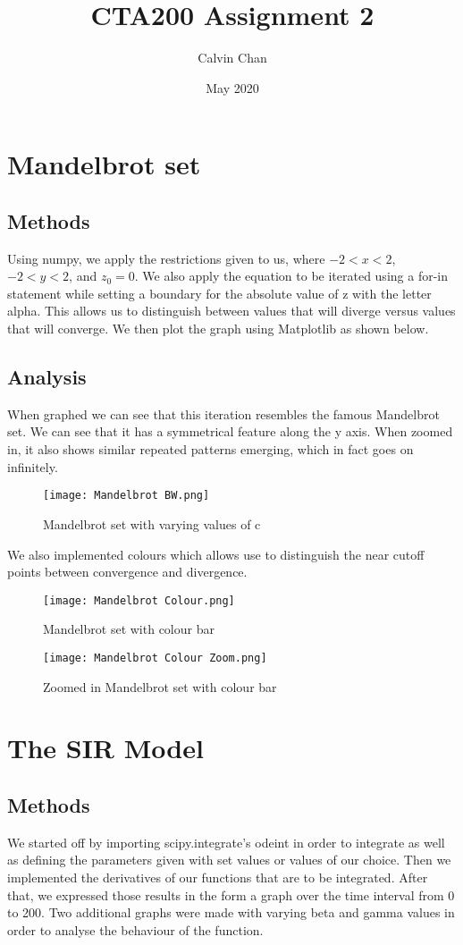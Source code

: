 \documentclass{article}
\title{CTA200 Assignment 2}
\author{Calvin Chan}
\date{May 2020}
\begin{document}
\maketitle
\section{Mandelbrot set}
\subsection{Methods}
Using numpy, we apply the restrictions given to us, where $-2 < x < 2$, $-2 < y < 2$, and $z_0 = 0$. We also apply the equation to be iterated using a for-in statement while setting a boundary for the absolute value of z with the letter alpha. This allows us to distinguish between values that will diverge versus values that will converge. We then plot the graph using Matplotlib as shown below. 
\subsection{Analysis}
When graphed we can see that this iteration resembles the famous Mandelbrot set. We can see that it has a symmetrical feature along the y axis. When zoomed in, it also shows similar repeated patterns emerging, which in fact goes on infinitely.
\begin{figure}[h!]
    \centering
    \texttt{[image: Mandelbrot BW.png]}
    \caption{Mandelbrot set with varying values of c}
    \label{fig:Mandelbrot_set_BW}
\end{figure}

\newpage{}
We also implemented colours which allows use to distinguish the near cutoff points between convergence and divergence.

\begin{figure}[h!]
    \centering
    \texttt{[image: Mandelbrot Colour.png]}
    \caption{Mandelbrot set with colour bar}
    \label{fig:Mandelbrot_set_colour}

    \centering
    \texttt{[image: Mandelbrot Colour Zoom.png]}
    \caption{Zoomed in Mandelbrot set with colour bar}
    \label{fig:Mandelbrot_set_colour_zoom}
\end{figure}

\newpage{}

\section{The SIR Model}
\subsection{Methods}
We started off by importing scipy.integrate's odeint in order to integrate as well as defining the parameters given with set values or values of our choice. Then we implemented the derivatives of our functions that are to be integrated. After that, we expressed those results in the form a graph over the time interval from 0 to 200. Two additional graphs were made with varying beta and gamma values in order to analyse the behaviour of the function. 
\end{document}

